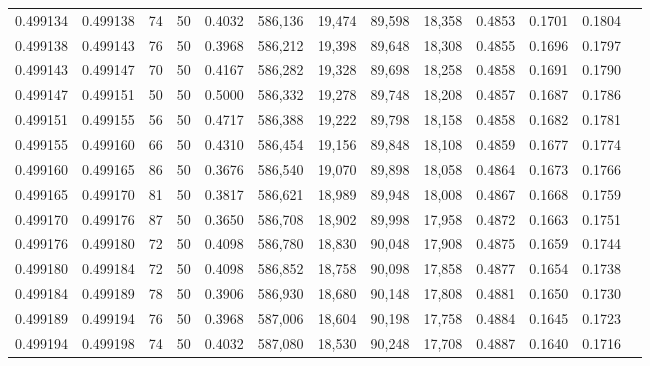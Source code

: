 \begin{tabular}{rrrrrrrrrrrrr}
0.499134 & 0.499138 &    74 &  50 &                                     0.4032 & 586,136 &  19,474 &  89,598 &  18,358 & 0.4853 & 0.1701 & 0.1804 \\
0.499138 & 0.499143 &    76 &  50 &                                     0.3968 & 586,212 &  19,398 &  89,648 &  18,308 & 0.4855 & 0.1696 & 0.1797 \\
0.499143 & 0.499147 &    70 &  50 &                                     0.4167 & 586,282 &  19,328 &  89,698 &  18,258 & 0.4858 & 0.1691 & 0.1790 \\
0.499147 & 0.499151 &    50 &  50 &                                     0.5000 & 586,332 &  19,278 &  89,748 &  18,208 & 0.4857 & 0.1687 & 0.1786 \\
0.499151 & 0.499155 &    56 &  50 &                                     0.4717 & 586,388 &  19,222 &  89,798 &  18,158 & 0.4858 & 0.1682 & 0.1781 \\
0.499155 & 0.499160 &    66 &  50 &                                     0.4310 & 586,454 &  19,156 &  89,848 &  18,108 & 0.4859 & 0.1677 & 0.1774 \\
0.499160 & 0.499165 &    86 &  50 &                                     0.3676 & 586,540 &  19,070 &  89,898 &  18,058 & 0.4864 & 0.1673 & 0.1766 \\
0.499165 & 0.499170 &    81 &  50 &                                     0.3817 & 586,621 &  18,989 &  89,948 &  18,008 & 0.4867 & 0.1668 & 0.1759 \\
0.499170 & 0.499176 &    87 &  50 &                                     0.3650 & 586,708 &  18,902 &  89,998 &  17,958 & 0.4872 & 0.1663 & 0.1751 \\
0.499176 & 0.499180 &    72 &  50 &                                     0.4098 & 586,780 &  18,830 &  90,048 &  17,908 & 0.4875 & 0.1659 & 0.1744 \\
0.499180 & 0.499184 &    72 &  50 &                                     0.4098 & 586,852 &  18,758 &  90,098 &  17,858 & 0.4877 & 0.1654 & 0.1738 \\
0.499184 & 0.499189 &    78 &  50 &                                     0.3906 & 586,930 &  18,680 &  90,148 &  17,808 & 0.4881 & 0.1650 & 0.1730 \\
0.499189 & 0.499194 &    76 &  50 &                                     0.3968 & 587,006 &  18,604 &  90,198 &  17,758 & 0.4884 & 0.1645 & 0.1723 \\
0.499194 & 0.499198 &    74 &  50 &                                     0.4032 & 587,080 &  18,530 &  90,248 &  17,708 & 0.4887 & 0.1640 & 0.1716 \\

\end{tabular}
